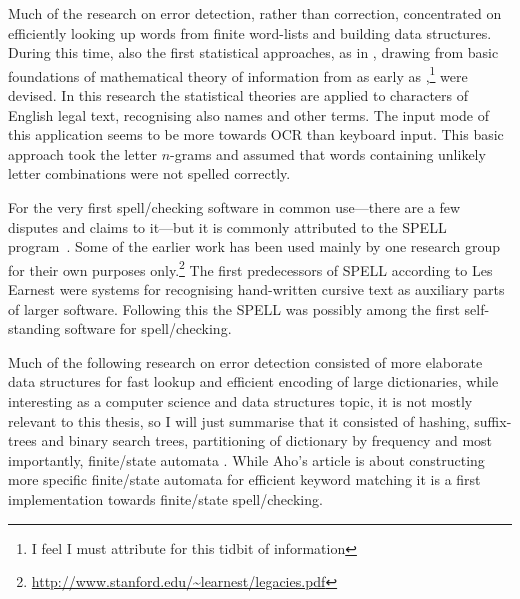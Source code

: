 \documentclass[officiallayout]{unihelcompling}
\begin{document}
Much of the research on error detection, rather than correction, concentrated
on efficiently looking up words from finite word-lists and building data
structures. During this time, also the first statistical approaches, as in
\citet{raviv1967decision}, drawing from basic foundations of mathematical
theory of information from as early as
\citet{shannon1948mathematical},\footnote{I feel I must attribute
\citet{liberman2012noisily} for this tidbit of information} were devised. In
this research the statistical theories are applied to characters of English
legal text, recognising also names and other terms. The input mode of this
application seems to be more towards OCR than keyboard input. This basic
approach took the letter \(n\)-grams and assumed that words containing unlikely
letter combinations were not spelled correctly.

For the very first spell\-/checking software in common use---there are a few
disputes and claims to it---but it is commonly attributed to the SPELL
program~\citep{gorin1971spell}.  Some of the earlier work has been used mainly
by one research group for their own purposes
only.\footnote{\url{http://www.stanford.edu/~learnest/legacies.pdf}} The first
predecessors of SPELL according to Les Earnest were systems for recognising
hand-written cursive text as auxiliary parts of larger software. Following this
the SPELL was possibly among the first self-standing software for
spell\-/checking.


Much of the following research on error detection consisted of more elaborate
data structures for fast lookup and efficient encoding of large dictionaries,
while interesting as a computer science and data structures topic, it is not
mostly relevant to this thesis, so I will just summarise that it consisted of
hashing, suffix-trees and binary search trees, partitioning of dictionary by
frequency \citep{knuth1973art} and most importantly, finite\-/state automata
\citep{aho1975efficient}. While Aho's article is about constructing more
specific finite\-/state automata for efficient keyword matching it is a first
implementation towards finite\-/state spell\-/checking.
\end{document}

